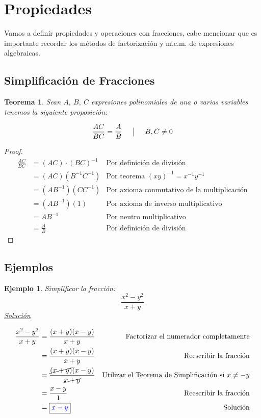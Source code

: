 \documentclass[A4paper, 10pt, oneside]{book}
\newtheorem{theorem}{Teorema}[chapter]
\newtheorem{example}{Ejemplo}[chapter]
\begin{document}
	\section{Propiedades}
	Vamos a definir propiedades y operaciones con fracciones, cabe mencionar que es importante recordar los métodos de factorización y m.c.m. de expresiones algebraicas. 
	
	\subsection{Simplificación de Fracciones}
	
	\begin{theorem}
		\label{TeoSimpF}
		Sean $A, \ B, \ C$ expresiones polinomiales de una o varias variables tenemos la siguiente proposición: 
		
		$$\frac{AC}{BC} = \frac{A}{B} \hspace{5mm} \big| \hspace{5mm} B, C \neq 0$$
		
	\end{theorem}

	\begin{proof}
		\begin{align*}
			\frac{AC}{BC} &= (AC)\cdot(BC)^{-1} & \text{Por definición de división}\\
						  &=(AC)(B^{-1}C^{-1}) & \text{Por teorema $(xy)^{-1} = x^{-1}y^{-1}$}\\
						  &=(AB^{-1})(CC^{-1}) & \text{Por axioma conmutativo de la multiplicación}\\
						  &=(AB^{-1})(1) & \text{Por axioma de inverso multiplicativo}\\
						  &=AB^{-1} & \text{Por neutro multiplicativo}\\
						  &=\frac{A}{B} & \text{Por definición de división}
		\end{align*}
	\end{proof}
	
	\subsection*{Ejemplos}
	
		\begin{example}
			Simplificar la fracción: $$\frac{x^2-y^2}{x+y}$$
			\underline{Solución}
			
			\begin{align*}
				\frac{x^2-y^2}{x+y} & = \frac{(x+y)(x-y)}{x+y} & \text{Factorizar el numerador completamente}\\
				&=\frac{(x+y)(x-y)}{x+y}  & \text{Reescribir la fracción}\\
				&=\frac{\cancel{(x+y)}(x-y)}{\cancel{x+y}} & \text{Utilizar el Teorema de Simplificación si $x\neq -y$}\\
				&=\frac{x-y}{1}  & \text{Reescribir la fracción}\\
				&= \fbox{\color{blue}{$x-y$}} & \text{Solución}
			\end{align*}
		\end{example}
	
\end{document}
